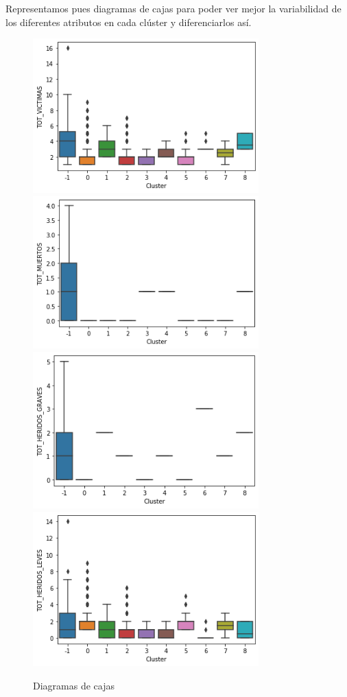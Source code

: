 \documentclass[a4]{article}
\begin{document}
Representamos pues diagramas de cajas para poder ver mejor la variabilidad de los diferentes atributos en cada clúster y diferenciarlos así.

\begin{figure}[H]
  \centering
  \caption{Diagramas de cajas}
  \includegraphics[width=87mm]{imagenes/c1_dbscan_vic}
  \includegraphics[width=87mm]{imagenes/c1_dbscan_muertos}
    \includegraphics[width=87mm]{imagenes/c1_dbscan_hg}
  \includegraphics[width=87mm]{imagenes/c1_dbscan_hl}

\end{figure}
\end{document}
